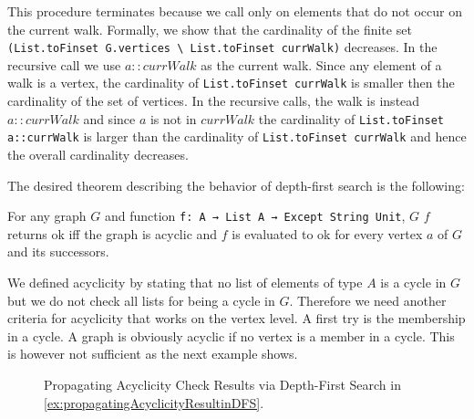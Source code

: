 This procedure terminates because we call \dfsstep only on elements that do not occur on the current walk. Formally, we show that the cardinality of the finite set \lstinline|(List.toFinset G.vertices \ List.toFinset currWalk)| decreases. In the recursive call we use $a::currWalk$ as the current walk. Since any element of a walk is a vertex, the cardinality of \lstinline|List.toFinset currWalk| is smaller then the cardinality of the set of vertices. In the recursive calls, the walk is instead $a::currWalk$ and since $a$ is not in $currWalk$ the cardinality of \lstinline|List.toFinset a::currWalk| is larger than the cardinality of \lstinline|List.toFinset currWalk| and hence the overall cardinality decreases.

The desired theorem describing the behavior of depth-first search is the following:

\begin{theorem}[\dfssemantics]\label{trm:dfssemantics}
    For any graph $G$ and function \lstinline|f: A → List A → Except String Unit|, \dfs $G$ $f$ returns ok iff the graph is acyclic and $f$ is evaluated to ok for every vertex $a$ of $G$ and its successors.
\end{theorem}

We defined acyclicity by stating that no list of elements of type $A$ is a cycle in $G$ but we do not check all lists for being a cycle in $G$. Therefore we need another criteria for acyclicity that works on the vertex level. A first try is the membership in a cycle. A graph is obviously acyclic if no vertex is a member in a cycle. This is however not sufficient as the next example shows.

\begin{figure}
  \center
  \caption{Propagating Acyclicity Check Results via Depth-First Search in \cref{ex:propagatingAcyclicityResultinDFS}.}\label{fig:propagatingAcyclicityResultinDFS}
\end{figure}

